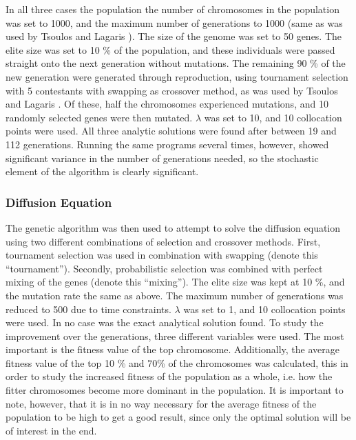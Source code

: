 \documentclass[multicolumn, 9pt]{extarticle}
\begin{document}
In all three cases the population the number of chromosomes in the population was set to 1000, and the maximum number of generations to 1000 (same as was used by Tsoulos and Lagaris \cite{Lagaris}). The size of the genome was set to 50 genes. The elite size was set to 10 \% of the population, and these individuals were passed straight onto the next generation without mutations. The remaining 90 \% of the new generation were generated through reproduction, using tournament selection with 5 contestants with swapping as crossover method, as was used by Tsoulos and Lagaris \cite{Lagaris}. Of these, half the chromosomes experienced mutations, and 10 randomly selected genes were then mutated. $\lambda$ was set to 10, and 10 collocation points were used. All three analytic solutions were found after between 19 and 112 generations. Running the same programs several times, however, showed significant variance in the number of generations needed, so the stochastic element of the algorithm is clearly significant. 


\subsubsection{Diffusion Equation}
The genetic algorithm was then used to attempt to solve the diffusion equation using two different combinations of selection and crossover methods. First, tournament selection was used in combination with swapping (denote this ``tournament''). Secondly, probabilistic selection was combined with perfect mixing of the genes (denote this ``mixing''). The elite size was kept at 10 \%, and the mutation rate the same as above. The maximum number of generations was reduced to 500 due to time constraints. $\lambda$ was set to 1, and 10 collocation points were used. In no case was the exact analytical solution found. To study the improvement over the generations, three different variables were used. The most important is the fitness value of the top chromosome. Additionally, the average fitness value of the top 10 \% and 70\% of the chromosomes was calculated, this in order to study the increased fitness of the population as a whole, i.e. how the fitter chromosomes become more dominant in the population. It is important to note, however, that it is in no way necessary for the average fitness of the population to be high to get a good result, since only the optimal solution will be of interest in the end. 
\end{document}
